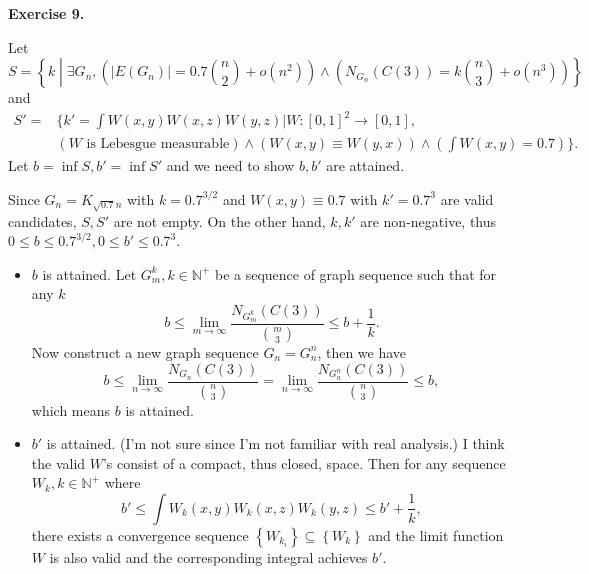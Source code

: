 \documentclass[a4paper]{article}
\newenvironment{exercise}[1]{
	\par
	\noindent\textbf{Exercise #1.}\quad
}{
	\par
	\bigskip
}
\newcommand{\pbra}[1]{\left( #1 \right)}
\newcommand{\cbra}[1]{\left\{ #1 \right\}}
\newcommand{\Nbb}{\mathbb{N}}
\begin{document}
\begin{exercise}{9}
    Let 
    $$
    S=\cbra{k\middle|\exists G_n,\pbra{|E(G_n)|=0.7\binom n2+o(n^2)}\land\pbra{N_{G_n}(C(3))=k\binom n3+o(n^3)}}
    $$
    and
    \begin{align*}
        S'=&\bigg\{k'=\int W(x,y)W(x,z)W(y,z)\bigg|W:[0,1]^2\to[0,1],\\
        &\pbra{W\text{ is Lebesgue measurable}}
        \land\pbra{W(x,y)\equiv W(y,x)}\land\pbra{\int W(x,y)=0.7}\bigg\}.
    \end{align*}
    Let $b=\inf S,b'=\inf S'$ and we need to show $b,b'$ are attained.

    Since $G_n=K_{\sqrt{0.7}n}$ with $k=0.7^{3/2}$ and $W(x,y)\equiv0.7$ with $k'=0.7^3$ are valid candidates, 
    $S,S'$ are not empty.
    On the other hand, $k,k'$ are non-negative, thus $0\leq b\leq0.7^{3/2},0\leq b'\leq0.7^3$.

    \begin{itemize}
        \item $b$ is attained. Let $G_m^k,k\in\Nbb^+$ be a sequence of graph sequence such that for any $k$
            $$
            b\leq\lim_{m\to\infty}\frac{N_{G_m^k}(C(3))}{\binom m3}\leq b+\frac1k.
            $$
            Now construct a new graph sequence $G_n=G_n^n$, then we have
            $$
            b\leq\lim_{n\to\infty}\frac{N_{G_n}(C(3))}{\binom n3}=
            \lim_{n\to\infty}\frac{N_{G_n^n}(C(3))}{\binom n3}\leq b,
            $$
            which means $b$ is attained.
        \item $b'$ is attained. (I'm not sure since I'm not familiar with real analysis.) 
            I think the valid $W$'s consist of a compact, thus closed, space.
            Then for any sequence $W_k,k\in\Nbb^+$ where 
            $$
            b'\leq\int W_k(x,y)W_k(x,z)W_k(y,z)\leq b'+\frac1k,
            $$
            there exists a convergence sequence $\cbra{W_{k_i}}\subseteq\cbra{W_k}$ and the limit function
            $W$ is also valid and the corresponding integral achieves $b'$.
    \end{itemize}
\end{exercise}
\end{document}
